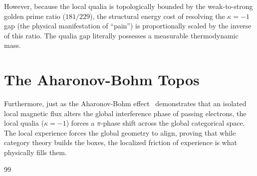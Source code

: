 However, because the local qualia is topologically bounded by the weak-to-strong golden prime ratio ($181/229$), the structural energy cost of resolving the $\kappa = -1$ gap (the physical manifestation of ``pain'') is proportionally scaled by the inverse of this ratio. The qualia gap literally possesses a measurable thermodynamic mass.

\section{The Aharonov-Bohm Topos}
Furthermore, just as the Aharonov-Bohm effect~\cite{aharonov1959} demonstrates that an isolated local magnetic flux alters the global interference phase of passing electrons, the local qualia ($\kappa = -1$) forces a $\pi$-phase shift across the global categorical space. The local experience forces the global geometry to align, proving that while category theory builds the boxes, the localized friction of experience is what physically fills them.


\vspace{2em}
\begin{thebibliography}{99}
\end{thebibliography}
